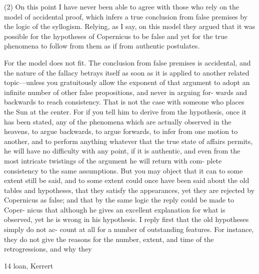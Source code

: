 \documentclass{article}
\begin{document}
{{{{{{{{{{{{{{{{(2) On this point I have never been able to agree with those who rely on the
model of accidental proof, which infers a true conclusion from false premises by
the logic of the syllogism. Relying, as I say, on this model they argued that it was
possible for the hypotheses of Copernicus to be false and yet for the true
phenomena to follow from them as if from authentic postulates.

For the model does not fit. The conclusion from false premises is accidental,
and the nature of the fallacy betrays itself as soon as it is applied to another
related topic—unless you gratuitously allow the exponent of that argument to
adopt an infinite number of other false propositions, and never in arguing for-
wards and backwards to reach consistency. That is not the case with someone
who places the Sun at the center. For if you tell him to derive from the
hypothesis, once it has been stated, any of the phenomena which are actually
observed in the heavens, to argue backwards, to argue forwards, to infer from
one motion to another, and to perform anything whatever that the true state of
affairs permits, he will have no difficulty with any point, if it is authentic, and
even from the most intricate twistings of the argument he will return with com-
plete consistency to the same assumptions. But you may object that it can to some
extent still be said, and to some extent could once have been said about the old
tables and hypotheses, that they satisfy the appearances, yet they are rejected by
Copernicus as false; and that by the same logic the reply could be made to Coper-
nicus that although he gives an excellent explanation for what is observed, yet he
is wrong in his hypothesis. I reply first that the old hypotheses simply do not ac-
count at all for a number of outstanding features. For instance, they do not give
the reasons for the number, extent, and time of the retrogressions, and why they

14 loan, Kerrert

}}}}}}}}}}}}}}}}
\end{document}
